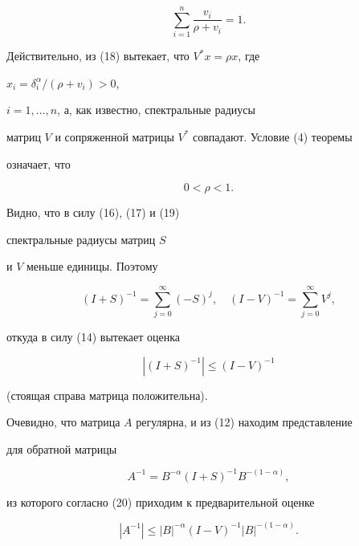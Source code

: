 \begin{pf}
\begin{equation}
\sum^n_{i=1}\frac{v_i}{\rho+v_i}=1. 


\end{equation} 


Действительно, из (18) вытекает, что $V^*x=\rho x$, где 


$x_i=\delta^\alpha_i/(\rho+v_i)>0$, 


$i=1,\dotsc,n$, а, как известно, спектральные радиусы 


матриц $V$ и сопряженной матрицы $V^*$ совпадают. Условие (4) теоремы 


означает, что 


\begin{equation} 


0<\rho<1. 


\end{equation} 


Видно, что в силу (16), (17) и (19) 


спектральные радиусы матриц $S$ 


и $V$ меньше единицы. Поэтому 


$$ 


(I+S)^{-1}=\sum^\infty_{j=0}(-S)^j,\quad 


(I-V)^{-1}=\sum^\infty_{j=0}V^j, 


$$ 


откуда в силу (14) вытекает оценка 


\begin{equation} 


|(I+S)^{-1}|\le(I-V)^{-1} 


\end{equation} 


(стоящая справа матрица положительна). 


 


Очевидно, что матрица $A$ регулярна, и из (12) находим представление  


для обратной матрицы 


$$ 


A^{-1}=B^{-\alpha}(I+S)^{-1}B^{-(1-\alpha)}, 


$$ 


из которого согласно (20) приходим к предварительной оценке 


\begin{equation} 


|A^{-1}|\le|B|^{-\alpha}(I-V)^{-1}|B|^{-(1-\alpha)}. 


\end{equation} 



\end{pf}
